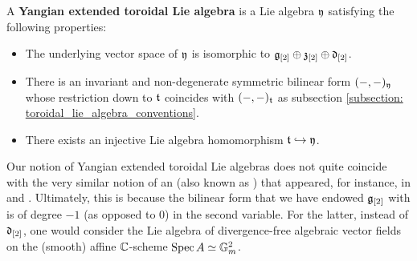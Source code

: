         \begin{definition} \label{def: yangian_extended_toroidal_lie_algebras}
            A \textbf{Yangian extended toroidal Lie algebra} is a Lie algebra $\mathfrak{y}$ satisfying the following properties:
            \begin{itemize}
                \item The underlying vector space of $\mathfrak{y}$ is isomorphic to $\mathfrak{g}_{[2]} \oplus \mathfrak{z}_{[2]} \oplus \mathfrak{d}_{[2]}$.
                \item There is an invariant and non-degenerate symmetric bilinear form $(-, -)_{\mathfrak{y}}$ whose restriction down to $\mathfrak{t}$ coincides with $(-, -)_{\mathfrak{t}}$ as subsection \ref{subsection: toroidal_lie_algebra_conventions}.
                \item There exists an injective Lie algebra homomorphism $\mathfrak{t} \hookrightarrow \mathfrak{y}$.
            \end{itemize}
        \end{definition}
        \begin{remark}
            Our notion of Yangian extended toroidal Lie algebras does not quite coincide with the very similar notion of an  (also known as ) that appeared, for instance, in \cite{billig_representations_of_toroidal_extended_affine_lie_algebras} and \cite{neher_lectures_on_EALAs}. Ultimately, this is because the bilinear form that we have endowed $\mathfrak{g}_{[2]}$ with is of degree $-1$ (as opposed to $0$) in the second variable. For the latter, instead of $\mathfrak{d}_{[2]}$, one would consider the Lie algebra of divergence-free algebraic vector fields on the (smooth) affine $\mathbb{C}$-scheme $\operatorname{Spec} A \simeq \mathbb{G}_m^2$.
        \end{remark}
        

